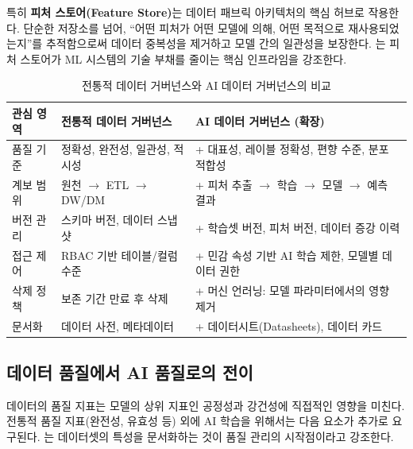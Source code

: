 특히 \textbf{피처 스토어(Feature Store)}는 데이터 패브릭 아키텍처의 핵심 허브로 작용한다. 단순한 저장소를 넘어, ``어떤 피처가 어떤 모델에 의해, 어떤 목적으로 재사용되었는지''를 추적함으로써 데이터 중복성을 제거하고 모델 간의 일관성을 보장한다. \cite{delarua2024hopsworks}는 피처 스토어가 ML 시스템의 기술 부채를 줄이는 핵심 인프라임을 강조한다.

\begin{table}[htbp]
\centering
\caption{전통적 데이터 거버넌스와 AI 데이터 거버넌스의 비교}
\label{tab:data_gov_comparison}
\begin{tabularx}{\textwidth}{p{3cm}XX}
\toprule
\textbf{관심 영역} & \textbf{전통적 데이터 거버넌스} & \textbf{AI 데이터 거버넌스 (확장)} \\
\midrule
품질 기준 & 정확성, 완전성, 일관성, 적시성 & + 대표성, 레이블 정확성, 편향 수준, 분포 적합성 \\
\midrule
계보 범위 & 원천 $\rightarrow$ ETL $\rightarrow$ DW/DM & + 피처 추출 $\rightarrow$ 학습 $\rightarrow$ 모델 $\rightarrow$ 예측 결과 \\
\midrule
버전 관리 & 스키마 버전, 데이터 스냅샷 & + 학습셋 버전, 피처 버전, 데이터 증강 이력 \\
\midrule
접근 제어 & RBAC 기반 테이블/컬럼 수준 & + 민감 속성 기반 AI 학습 제한, 모델별 데이터 권한 \\
\midrule
삭제 정책 & 보존 기간 만료 후 삭제 & + 머신 언러닝: 모델 파라미터에서의 영향 제거 \\
\midrule
문서화 & 데이터 사전, 메타데이터 & + 데이터시트(Datasheets), 데이터 카드\cite{breck2019data} \\
\bottomrule
\end{tabularx}
\end{table}


\subsection{데이터 품질에서 AI 품질로의 전이}
\label{sec:9.1.2}

데이터의 품질 지표는 모델의 상위 지표인 공정성과 강건성에 직접적인 영향을 미친다. 전통적 품질 지표(완전성, 유효성 등) 외에 AI 학습을 위해서는 다음 요소가 추가로 요구된다. \cite{gebru2021datasheets}는 데이터셋의 특성을 문서화하는 것이 품질 관리의 시작점이라고 강조한다.

